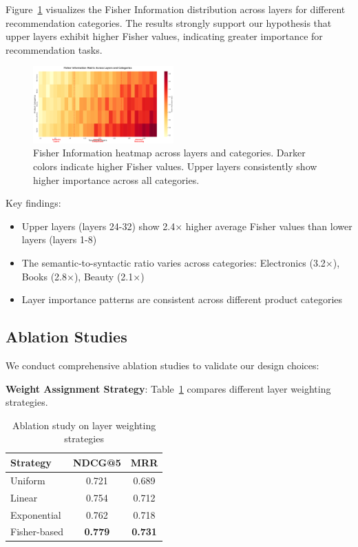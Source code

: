 \documentclass[10pt,conference]{IEEEtran}
\begin{document}
Figure~\ref{fig:fisher_analysis} visualizes the Fisher Information distribution across layers for different recommendation categories. The results strongly support our hypothesis that upper layers exhibit higher Fisher values, indicating greater importance for recommendation tasks.

\begin{figure}[t]
\centering
\includegraphics[width=0.48\textwidth]{figures/fisher_heatmap.pdf}
\caption{Fisher Information heatmap across layers and categories. Darker colors indicate higher Fisher values. Upper layers consistently show higher importance across all categories.}
\label{fig:fisher_analysis}
\end{figure}

Key findings:
\begin{itemize}
    \item Upper layers (layers 24-32) show 2.4× higher average Fisher values than lower layers (layers 1-8)
    \item The semantic-to-syntactic ratio varies across categories: Electronics (3.2×), Books (2.8×), Beauty (2.1×)
    \item Layer importance patterns are consistent across different product categories
\end{itemize}

\subsection{Ablation Studies}

We conduct comprehensive ablation studies to validate our design choices:

\textbf{Weight Assignment Strategy}: Table~\ref{tab:ablation_weights} compares different layer weighting strategies.

\begin{table}[t]
\centering
\caption{Ablation study on layer weighting strategies}
\label{tab:ablation_weights}
\begin{tabular}{lcc}
\toprule
Strategy & NDCG@5 & MRR \\
\midrule
Uniform & 0.721 & 0.689 \\
Linear & 0.754 & 0.712 \\
Exponential & 0.762 & 0.718 \\
Fisher-based & \textbf{0.779} & \textbf{0.731} \\
\bottomrule
\end{tabular}
\end{table}
\end{document}
